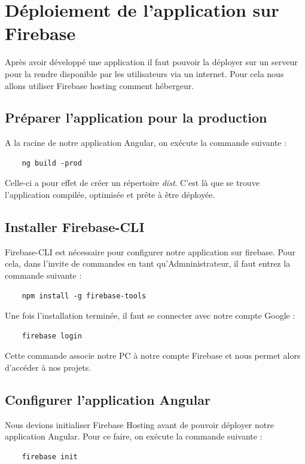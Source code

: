 \section{Déploiement de l'application sur Firebase}
Après avoir développé une application il faut pouvoir la déployer sur un serveur pour la rendre disponible par les utilisateurs via un internet. Pour cela nous allons utiliser Firebase hosting comment hébergeur.

\subsection{Préparer l'application pour la production}
A la racine de notre application Angular, on exécute la commande suivante : 

\begin{verbatim}
	ng build -prod
\end{verbatim}

Celle-ci a pour effet de créer un répertoire \emph{dist}. C'est là que se trouve l'application compilée, optimisée et prête à être déployée.

\subsection{Installer Firebase-CLI}
Firebase-CLI est nécessaire pour configurer notre application sur firebase. Pour cela, dans l'invite de commandes en tant qu'Admninistrateur, il faut entrez la commande suivante : 

\begin{verbatim}
	npm install -g firebase-tools
\end{verbatim}

Une fois l'installation terminée, il faut se connecter avec notre compte Google : 

\begin{verbatim}
	firebase login
\end{verbatim}

Cette commande associe notre PC à notre compte Firebase et nous permet alors d'accéder à nos projets.

\subsection{Configurer l'application Angular}
Nous devions initialiser Firebase Hosting avant de pouvoir déployer notre application Angular.
Pour ce faire, on exécute la commande suivante :

\begin{verbatim}
	firebase init
\end{verbatim}

